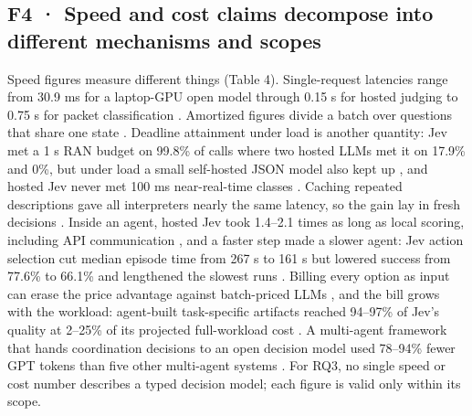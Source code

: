 \subsection{F4 · Speed and cost claims decompose into different mechanisms and scopes}

Speed figures measure different things (Table 4). Single-request latencies range from 30.9 ms for a laptop-GPU open model \citep{arxiv2609_23886} through 0.15 s for hosted judging \citep{arxiv2609_26550} to 0.75 s for packet classification \citep{arxiv2610_00376}. Amortized figures divide a batch over questions that share one state \citep{arxiv2609_25845,arxiv2609_39111}. Deadline attainment under load is another quantity: Jev met a 1 s RAN budget on 99.8\% of calls where two hosted LLMs met it on 17.9\% and 0\%, but under load a small self-hosted JSON model also kept up \citep{arxiv2609_23136}, and hosted Jev never met 100 ms near-real-time classes \citep{arxiv2609_33689}. Caching repeated descriptions gave all interpreters nearly the same latency, so the gain lay in fresh decisions \citep{arxiv2609_22753}. Inside an agent, hosted Jev took 1.4–2.1 times as long as local scoring, including API communication \citep{arxiv2610_00437}, and a faster step made a slower agent: Jev action selection cut median episode time from 267 s to 161 s but lowered success from 77.6\% to 66.1\% and lengthened the slowest runs \citep{arxiv2610_03935}. Billing every option as input can erase the price advantage against batch-priced LLMs \citep{arxiv2610_06625}, and the bill grows with the workload: agent-built task-specific artifacts reached 94–97\% of Jev's quality at 2–25\% of its projected full-workload cost \citep{arxiv2610_08775}. A multi-agent framework that hands coordination decisions to an open decision model used 78–94\% fewer GPT tokens than five other multi-agent systems \citep{arxiv2610_08155}. For RQ3, no single speed or cost number describes a typed decision model; each figure is valid only within its scope.

